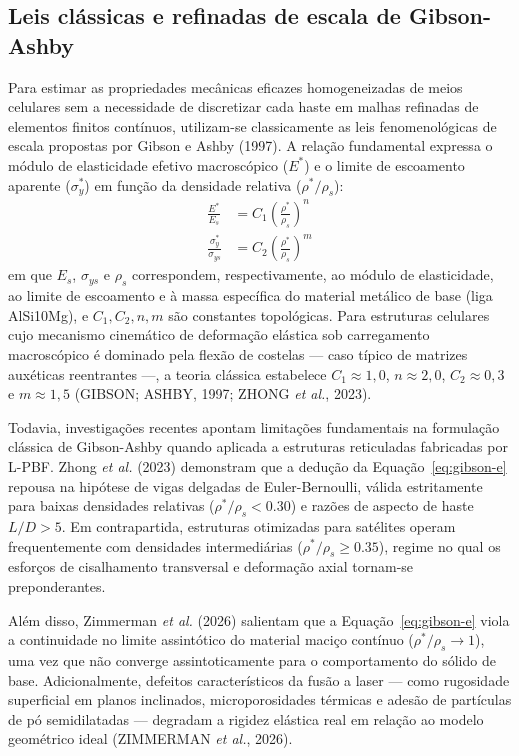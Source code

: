 \subsection{Leis clássicas e refinadas de escala de Gibson-Ashby}
\label{subsec:gibson-ashby-teoria}

Para estimar as propriedades mecânicas eficazes homogeneizadas de meios celulares sem a necessidade de discretizar cada haste em malhas refinadas de elementos finitos contínuos, utilizam-se classicamente as leis fenomenológicas de escala propostas por Gibson e Ashby (1997). A relação fundamental expressa o módulo de elasticidade efetivo macroscópico ($E^{*}$) e o limite de escoamento aparente ($\sigma_y^{*}$) em função da densidade relativa ($\rho^{*}/\rho_s$):
\begin{align}
  \frac{E^{*}}{E_s} &= C_1 \left( \frac{\rho^{*}}{\rho_s} \right)^{n} \label{eq:gibson-e} \\
  \frac{\sigma_y^{*}}{\sigma_{ys}} &= C_2 \left( \frac{\rho^{*}}{\rho_s} \right)^{m} \label{eq:gibson-sigma}
\end{align}
em que $E_s$, $\sigma_{ys}$ e $\rho_s$ correspondem, respectivamente, ao módulo de elasticidade, ao limite de escoamento e à massa específica do material metálico de base (liga AlSi10Mg), e $C_1, C_2, n, m$ são constantes topológicas. Para estruturas celulares cujo mecanismo cinemático de deformação elástica sob carregamento macroscópico é dominado pela flexão de costelas — caso típico de matrizes auxéticas reentrantes —, a teoria clássica estabelece $C_1 \approx 1{,}0$, $n \approx 2{,}0$, $C_2 \approx 0{,}3$ e $m \approx 1{,}5$ (GIBSON; ASHBY, 1997; ZHONG \textit{et al.}, 2023).

Todavia, investigações recentes apontam limitações fundamentais na formulação clássica de Gibson-Ashby quando aplicada a estruturas reticuladas fabricadas por L-PBF. Zhong \textit{et al.} (2023) demonstram que a dedução da Equação~\eqref{eq:gibson-e} repousa na hipótese de vigas delgadas de Euler-Bernoulli, válida estritamente para baixas densidades relativas ($\rho^{*}/\rho_s < \num{0.30}$) e razões de aspecto de haste $L/D > 5$. Em contrapartida, estruturas otimizadas para satélites operam frequentemente com densidades intermediárias ($\rho^{*}/\rho_s \ge \num{0.35}$), regime no qual os esforços de cisalhamento transversal e deformação axial tornam-se preponderantes. 

Além disso, Zimmerman \textit{et al.} (2026) salientam que a Equação~\eqref{eq:gibson-e} viola a continuidade no limite assintótico do material maciço contínuo ($\rho^{*}/\rho_s \to 1$), uma vez que não converge assintoticamente para o comportamento do sólido de base. Adicionalmente, defeitos característicos da fusão a laser — como rugosidade superficial em planos inclinados, microporosidades térmicas e adesão de partículas de pó semidilatadas — degradam a rigidez elástica real em relação ao modelo geométrico ideal (ZIMMERMAN \textit{et al.}, 2026).

